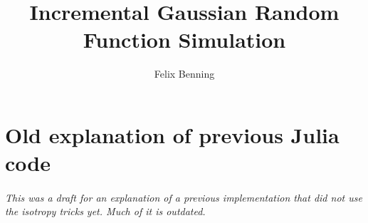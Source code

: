 \documentclass[a4paper]{article}
\title{Incremental Gaussian Random Function Simulation}
\author{Felix Benning}
\begin{document}
	\maketitle 
	


	
	
	

	
	\newpage
	\appendix
	
	\part{Old explanation of previous Julia code}
	\paragraph*{
		This was a draft for an
		explanation of a previous implementation that did not
		use the isotropy tricks yet. Much of it is outdated.
	}

	
	
	
	
\end{document}
